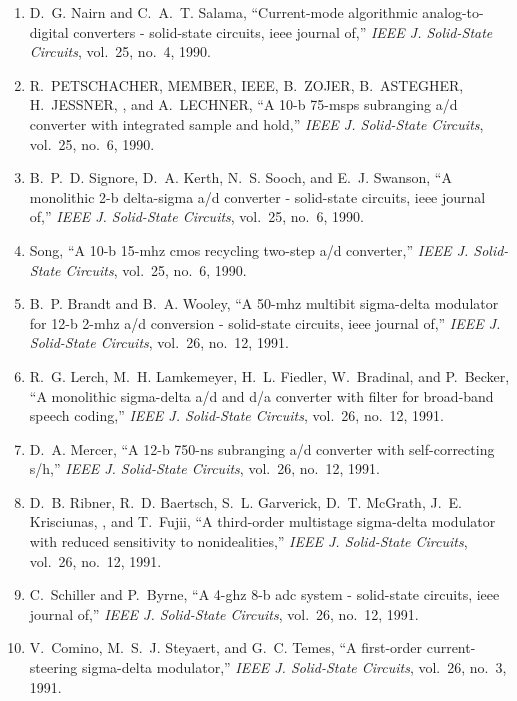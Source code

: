 \begin{enumerate}
\item
D.~G. Nairn and C.~A.~T. Salama, ``Current-mode algorithmic analog-to-digital
  converters - solid-state circuits, ieee journal of,'' \emph{{IEEE} J.
  Solid-State Circuits}, vol.~25, no.~4, 1990.

\item
R.~PETSCHACHER, MEMBER, IEEE, B.~ZOJER, B.~ASTEGHER, H.~JESSNER, , and
  A.~LECHNER, ``A 10-b 75-msps subranging a/d converter with integrated sample
  and hold,'' \emph{{IEEE} J. Solid-State Circuits}, vol.~25, no.~6, 1990.

\item
B.~P.~D. Signore, D.~A. Kerth, N.~S. Sooch, and E.~J. Swanson, ``A monolithic
  2-b delta-sigma a/d converter - solid-state circuits, ieee journal of,''
  \emph{{IEEE} J. Solid-State Circuits}, vol.~25, no.~6, 1990.

\item
Song, ``A 10-b 15-mhz cmos recycling two-step a/d converter,'' \emph{{IEEE} J.
  Solid-State Circuits}, vol.~25, no.~6, 1990.

\item
B.~P. Brandt and B.~A. Wooley, ``A 50-mhz multibit sigma-delta modulator for
  12-b 2-mhz a/d conversion - solid-state circuits, ieee journal of,''
  \emph{{IEEE} J. Solid-State Circuits}, vol.~26, no.~12, 1991.

\item
R.~G. Lerch, M.~H. Lamkemeyer, H.~L. Fiedler, W.~Bradinal, and P.~Becker, ``A
  monolithic sigma-delta a/d and d/a converter with filter for broad-band
  speech coding,'' \emph{{IEEE} J. Solid-State Circuits}, vol.~26, no.~12,
  1991.

\item
D.~A. Mercer, ``A 12-b 750-ns subranging a/d converter with self-correcting
  s/h,'' \emph{{IEEE} J. Solid-State Circuits}, vol.~26, no.~12, 1991.

\item
D.~B. Ribner, R.~D. Baertsch, S.~L. Garverick, D.~T. McGrath, J.~E. Krisciunas,
  , and T.~Fujii, ``A third-order multistage sigma-delta modulator with reduced
  sensitivity to nonidealities,'' \emph{{IEEE} J. Solid-State Circuits},
  vol.~26, no.~12, 1991.

\item
C.~Schiller and P.~Byrne, ``A 4-ghz 8-b adc system - solid-state circuits, ieee
  journal of,'' \emph{{IEEE} J. Solid-State Circuits}, vol.~26, no.~12, 1991.

\item
V.~Comino, M.~S.~J. Steyaert, and G.~C. Temes, ``A first-order current-steering
  sigma-delta modulator,'' \emph{{IEEE} J. Solid-State Circuits}, vol.~26,
  no.~3, 1991.


\end{enumerate}
